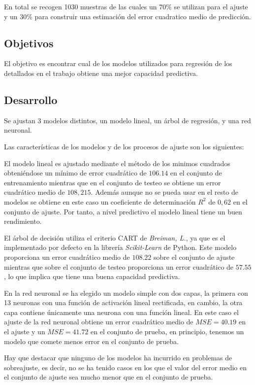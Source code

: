\noindent 

\noindent En total se recogen 1030 muestras de las cuales un 70\% se utilizan para el ajuste y un 30\% para construir una estimación del error cuadratico medio de predicción. 
\subsection*{Objetivos} 

\noindent El objetivo es encontrar cual de los modelos utilizados para regresión de los detallados en el trabajo obtiene una mejor capacidad predictiva. 
\subsection*{Desarrollo}
\noindent Se ajustan 3 modelos distintos, un modelo lineal, un árbol de regresión, y una red neuronal. 

\noindent Las características de los modelos y de los procesos de ajuste son los siguientes:

\noindent El modelo lineal es ajustado mediante el método de los minimos cuadrados obteniéndose un mínimo de error cuadrático de $106.14$ en el conjunto de entrenamiento mientras que en el conjunto de testeo se obtiene un error cuadrático medio de $108,215$. Además aunque no se pueda usar en el resto de modelos se obtiene en este caso un coeficiente de determinación $R^2$ de $0,62$ en el conjunto de ajuste. Por tanto, a nivel predictivo el modelo lineal tiene un buen rendimiento. 

\noindent El árbol de decisión utiliza el criterio CART de \emph{Breiman, L.}\cite{Breiman 1984}, ya que es el implementado por defecto en la librería \emph{Scikit-Learn} de Python. Este modelo proporciona un error cuadrático medio de  $108.22$ sobre el conjunto de ajuste mientras que sobre el conjunto de testeo proporciona un error cuadrático de $57.55$, lo que implica que tiene una buena capacidad predictiva. 

\noindent En la red neuronal se ha elegido un modelo simple con dos capas, la primera con 13 neuronas con una función de activación lineal rectificada, en cambio, la otra capa contiene únicamente una neurona con una función lineal. En este caso el ajuste de la red neuronal obtiene un error cuadrático medio de $MSE=40.19$ en el ajuste y un $MSE=41.72$ en el conjunto de prueba, en principio, tenemos un modelo que comete menos error en el conjunto de prueba. 

\noindent Hay que destacar que ninguno de los modelos ha incurrido en problemas de sobreajuste, es decir, no se ha tenido casos en los que el valor del error medio en el conjunto de ajuste sea mucho menor que en el conjunto de prueba. 

